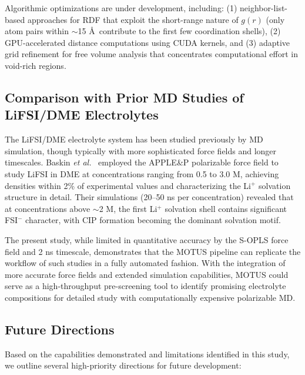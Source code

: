 \documentclass[twocolumn,10pt]{article}
\begin{document}
Algorithmic optimizations are under development, including: (1) neighbor-list-based approaches for RDF that exploit the short-range nature of $g(r)$ (only atom pairs within $\sim$15 \AA\ contribute to the first few coordination shells), (2) GPU-accelerated distance computations using CUDA kernels, and (3) adaptive grid refinement for free volume analysis that concentrates computational effort in void-rich regions.

\subsection{Comparison with Prior MD Studies of LiFSI/DME Electrolytes}

The LiFSI/DME electrolyte system has been studied previously by MD simulation, though typically with more sophisticated force fields and longer timescales. Baskin \textit{et al.}~\cite{baskin2021} employed the APPLE\&P polarizable force field to study LiFSI in DME at concentrations ranging from 0.5 to 3.0 M, achieving densities within 2\% of experimental values and characterizing the Li$^+$ solvation structure in detail. Their simulations (20--50 ns per concentration) revealed that at concentrations above $\sim$2 M, the first Li$^+$ solvation shell contains significant FSI$^-$ character, with CIP formation becoming the dominant solvation motif.

The present study, while limited in quantitative accuracy by the S-OPLS force field and 2 ns timescale, demonstrates that the MOTUS pipeline can replicate the workflow of such studies in a fully automated fashion. With the integration of more accurate force fields and extended simulation capabilities, MOTUS could serve as a high-throughput pre-screening tool to identify promising electrolyte compositions for detailed study with computationally expensive polarizable MD.

\subsection{Future Directions}

Based on the capabilities demonstrated and limitations identified in this study, we outline several high-priority directions for future development:
\end{document}
